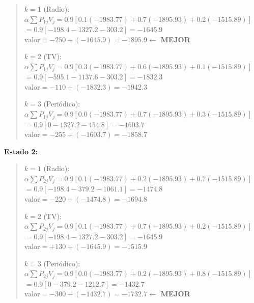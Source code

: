 \documentclass[12pt,a4paper]{article}
\begin{document}
\begin{quote}\footnotesize
$k=1$ (Radio):\;
$\alpha\sum P_{1j}V_j = 0.9[0.1(-1983.77) + 0.7(-1895.93) + 0.2(-1515.89)]$ \\
\hspace*{1.8cm} $= 0.9[-198.4 - 1327.2 - 303.2] = -1645.9$ \\
\hspace*{1.8cm} $\text{valor} = -250 + (-1645.9) = \mathbf{-1895.9}$\quad $\leftarrow$ \textbf{MEJOR}

\vspace{3pt}
$k=2$ (TV):\;
$\alpha\sum P_{1j}V_j = 0.9[0.3(-1983.77) + 0.6(-1895.93) + 0.1(-1515.89)]$ \\
\hspace*{1.8cm} $= 0.9[-595.1 - 1137.6 - 303.2] = -1832.3$ \\
\hspace*{1.8cm} $\text{valor} = -110 + (-1832.3) = -1942.3$

\vspace{3pt}
$k=3$ (Periódico):\;
$\alpha\sum P_{1j}V_j = 0.9[0.0(-1983.77) + 0.7(-1895.93) + 0.3(-1515.89)]$ \\
\hspace*{1.8cm} $= 0.9[0 - 1327.2 - 454.8] = -1603.7$ \\
\hspace*{1.8cm} $\text{valor} = -255 + (-1603.7) = -1858.7$
\end{quote}

\vspace{0.3cm}
\textbf{Estado 2:}

\begin{quote}\footnotesize
$k=1$ (Radio):\;
$\alpha\sum P_{2j}V_j = 0.9[0.1(-1983.77) + 0.2(-1895.93) + 0.7(-1515.89)]$ \\
\hspace*{1.8cm} $= 0.9[-198.4 - 379.2 - 1061.1] = -1474.8$ \\
\hspace*{1.8cm} $\text{valor} = -220 + (-1474.8) = -1694.8$

\vspace{3pt}
$k=2$ (TV):\;
$\alpha\sum P_{2j}V_j = 0.9[0.1(-1983.77) + 0.7(-1895.93) + 0.2(-1515.89)]$ \\
\hspace*{1.8cm} $= 0.9[-198.4 - 1327.2 - 303.2] = -1645.9$ \\
\hspace*{1.8cm} $\text{valor} = +130 + (-1645.9) = -1515.9$

\vspace{3pt}
$k=3$ (Periódico):\;
$\alpha\sum P_{2j}V_j = 0.9[0.0(-1983.77) + 0.2(-1895.93) + 0.8(-1515.89)]$ \\
\hspace*{1.8cm} $= 0.9[0 - 379.2 - 1212.7] = -1432.7$ \\
\hspace*{1.8cm} $\text{valor} = -300 + (-1432.7) = \mathbf{-1732.7}$\quad $\leftarrow$ \textbf{MEJOR}
\end{quote}
\end{document}
